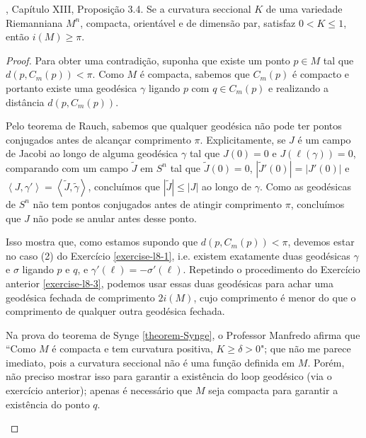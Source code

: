 \begin{exercise}
\label{exercise-l8-3}
\cite{doc}, Capítulo XIII, Proposição 3.4. Se a curvatura seccional $K$ de uma
variedade Riemanniana $M^n$, compacta, orientável e de dimensão par, satisfaz 
$0<K \leq 1$, então $i(M) \geq \pi$.
\end{exercise}

\begin{proof}
Para obter uma contradição, suponha que existe um ponto $p \in M$ tal que
 $d(p, C_m(p))<\pi$. Como $M$ é compacta, sabemos que $C_m(p)$ é compacto e
portanto existe uma geodésica $\gamma$ ligando $p$ com $q \in C_m(p)$ e
realizando a distância $d(p,C_m(p))$.

Pelo teorema de Rauch, sabemos que qualquer geodésica não pode ter pontos
conjugados antes de alcançar comprimento $\pi$. Explicitamente, se $J$ é um
campo de Jacobi ao longo de alguma geodésica $\gamma$ tal que $J(0)=0$ e 
$J(\ell(\gamma))=0$, comparando com um campo $\tilde{J}$ em $S^n$ tal que
 $\tilde{J}(0)=0$, $|\tilde{J}'(0)|=|J'(0)|$ e 
$\left<J,\gamma'\right>=\left<\tilde{J},\tilde{\gamma}\right>$, concluímos que
 $|\tilde{J}|\leq |J|$ ao longo de $\gamma$. Como as geodésicas de $S^n$ não
 tem pontos conjugados antes de atingir comprimento $\pi$, concluímos que 
$J$ não pode se anular antes desse ponto.

Isso mostra que, como estamos supondo que $d(p,C_m(p))<\pi$, devemos estar no
caso (2) do Exercício \ref{exercise-l8-1}, i.e. existem exatamente duas
geodésicas $\gamma$ e $\sigma$ ligando $p$ e $q$, e
$\gamma'(\ell)=-\sigma'(\ell)$. Repetindo o procedimento do Exercício anterior
 \ref{exercise-l8-3}, podemos usar essas duas geodésicas para achar uma 
geodésica fechada de comprimento $2i(M)$, cujo comprimento é menor do que o
comprimento de qualquer outra geodésica fechada.

\begin{remark}
\label{remark-curvatura-positiva-implica-maior-que-constante-positiva}
Na prova do teorema de Synge \ref{theorem-Synge}, o Professor
Manfredo afirma que ``Como $M$ é compacta e tem curvatura positiva, $K\geq
\delta>0$"; que não me parece imediato, pois a curvatura seccional não é uma
função definida em $M$. Porém, não preciso mostrar isso para garantir a
existência do loop geodésico (via o exercício anterior); apenas é necessário 
que $M$ seja compacta para garantir a existência do ponto $q$.
\end{remark}

\medskip


\end{proof}
